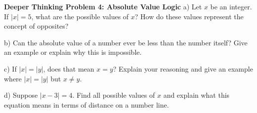 \documentclass[12pt, letterpaper, fleqn]{article}
\begin{document}
\begin{tcolorbox}[colback=white, colframe=black, boxrule=1pt, arc=4mm, left=6mm, right=6mm, top=5mm, bottom=5mm]
\textbf{Deeper Thinking Problem 4: Absolute Value Logic}
\medskip
\noindent
a) Let $x$ be an integer. If $|x| = 5$, what are the possible values of $x$? How do these values represent the concept of opposites?

\vspace{3cm}

\noindent
b) Can the absolute value of a number ever be less than the number itself? Give an example or explain why this is impossible.

\vspace{4cm}

\noindent
c) If $|x| = |y|$, does that mean $x = y$? Explain your reasoning and give an example where $|x| = |y|$ but $x \neq y$.

\vspace{4cm}

\noindent
d) Suppose $|x - 3| = 4$. Find all possible values of $x$ and explain what this equation means in terms of distance on a number line.

\vspace{4cm}

\end{tcolorbox}
\end{document}
